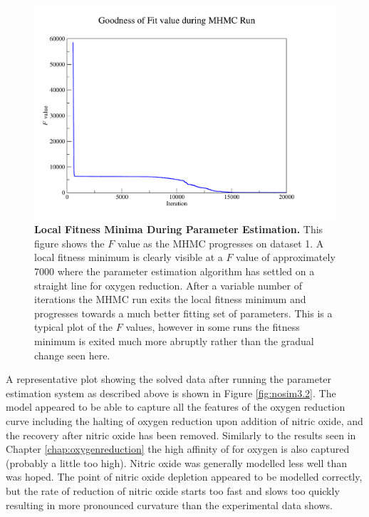 \begin{figure}[tbp]
 \centering
 \includegraphics[width=15cm, trim=0.5cm 1cm 3cm 1cm, clip=true]{./06-noreduction/data/ds3-bof.pdf}
 \caption[{Local Fitness Minima During Parameter Estimation.}]{{\bf Local Fitness Minima During Parameter Estimation.} This figure shows the $F$ value as the MHMC progresses on dataset 1. A local fitness minimum is clearly visible at a $F$ value of approximately 7000 where the parameter estimation algorithm has settled on a straight line for oxygen reduction. After a variable number of iterations the MHMC run exits the local fitness minimum and progresses towards a much better fitting set of parameters. This is a typical plot of the $F$ values, however in some runs the fitness minimum is exited much more abruptly rather than the gradual change seen here.}
 \label{fig:nosim3-bof}
\end{figure}

A representative plot showing the solved data after running the parameter estimation system as described above is shown in Figure \ref{fig:nosim3.2}. The model appeared to be able to capture all the features of the oxygen reduction curve including the halting of oxygen reduction upon addition of nitric oxide, and the recovery after nitric oxide has been removed. Similarly to the results seen in Chapter \ref{chap:oxygenreduction} the high affinity of \cbbthree{} for oxygen is also captured (probably a little too high). Nitric oxide was generally modelled less well than was hoped. The point of nitric oxide depletion appeared to be modelled correctly, but the rate of reduction of nitric oxide starts too fast and slows too quickly resulting in more pronounced curvature than the experimental data shows.

